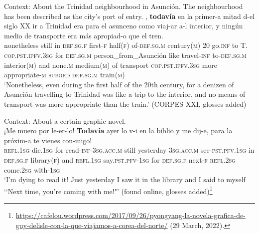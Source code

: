 \begin{exe}
	\ex Context: About the Trinidad neighbourhood in Asunción. The neighbourhood has been described as the city's port of entry.
, \textbf{todavía} en la primer-a mitad d-el siglo XX ir a Trinidad era para el asunceno como viaj-ar a-l interior, y ningún medio de transporte era más apropiad-o que el tren.\\
	nonetheless still in \textsc{def}.\textsc{sg}.\textsc{f} first-\textsc{f} half(\textsc{f}) of-\textsc{def}.\textsc{sg}.\textsc{m} century(\textsc{m}) 20 go.\textsc{inf} to T. \textsc{cop}.\textsc{pst}.\textsc{ipfv}.3\textsc{sg} for \textsc{def}.\textsc{sg}.\textsc{m} person\_from\_Asunción like travel-\textsc{inf} to-\textsc{def}.\textsc{sg}.\textsc{m} interior(\textsc{m}) and none.\textsc{m} medium(\textsc{m}) of transport \textsc{cop}.\textsc{pst}.\textsc{ipfv}.3\textsc{sg} more appropriate-\textsc{m} \textsc{subord} \textsc{def}.\textsc{sg}.\textsc{m} train(\textsc{m})\\
	\glt \lq Nonetheless, even during the first half of the 20th century, for a denizen of Asunción travelling to Trinidad was like a trip to the interior, and no means of transport was more appropriate than the train.' (CORPES XXI, glosses added)
	
	\ex Context: About a certain graphic novel.\\
	\gll ¡Me muero por le-er-lo! \textbf{Todavía} ayer lo v-i en la biblio y me dij-e, para la próxim-a te vienes con-migo!\\
	\textsc{refl}.1\textsc{sg} die.1\textsc{sg} for read-\textsc{inf}-3\textsc{sg}.\textsc{acc}.\textsc{m} still yesterday 3\textsc{sg}.\textsc{acc}.\textsc{m} see-\textsc{pst}.\textsc{pfv}.1\textsc{sg} in \textsc{def}.\textsc{sg}.\textsc{f} library(\textsc{f}) and \textsc{refl}.1\textsc{sg} say.\textsc{pst}.\textsc{pfv}-1\textsc{sg} for \textsc{def}.\textsc{sg}.\textsc{f} next-\textsc{f} \textsc{refl}.2\textsc{sg} come.2\textsc{sg} with-1\textsc{sg}\\
	\glt \lq I'm dying to read it! Just yesterday I saw it in the library and I said to myself \lq\lq Next time, you're coming with me!"' (found online, glosses added)\footnote{\url{https://cafelou.wordpress.com/2017/09/26/pyongyang-la-novela-grafica-de-guy-delisle-con-la-que-viajamos-a-corea-del-norte/} (29 March, 2022).}
\end{exe}	

